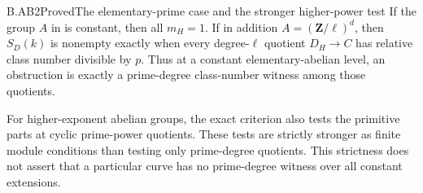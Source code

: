 \begin{claim}{B.AB2}{Proved}{The elementary-prime case and the stronger higher-power test}
If the group $A$ in  is constant, then all
$m_H=1$. If in addition $A=(\mathbf Z/\ell)^d$, then
$S_D(k)$ is nonempty exactly when every degree-$\ell$ quotient
$D_H\to C$ has relative class number divisible by $p$.
Thus at a constant elementary-abelian level, an obstruction
is exactly a prime-degree class-number witness among those
quotients.

For higher-exponent abelian groups, the exact criterion also
tests the primitive parts at cyclic prime-power quotients.
These tests are strictly stronger as finite module conditions
than testing only prime-degree quotients. This strictness does
not assert that a particular curve has no prime-degree witness
over all constant extensions.
\end{claim}
